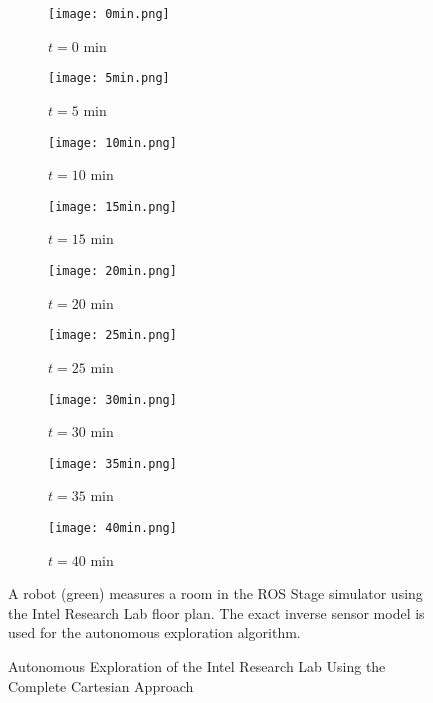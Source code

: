 \begin{figure}[!ht]
    \centering
    \begin{subfigure}[t]{0.3\columnwidth}
        \centering
        \texttt{[image: 0min.png]}
        \caption{$t=0$ min}
        \label{fig:IRL0min}
    \end{subfigure}
    \begin{subfigure}[t]{0.3\columnwidth}
        \centering
        \texttt{[image: 5min.png]}
        \caption{$t=5$ min}
        \label{fig:IRL5min}
    \end{subfigure}
    \begin{subfigure}[t]{0.3\columnwidth}
           \centering
           \texttt{[image: 10min.png]}
        \caption{$t=10$ min}
        \label{fig:IRL10min}
    \end{subfigure}
    \begin{subfigure}[t]{0.3\columnwidth}
           \centering
           \texttt{[image: 15min.png]}
        \caption{$t=15$ min}
        \label{fig:IRL15min}
    \end{subfigure}
    \begin{subfigure}[t]{0.3\columnwidth}
         \centering
         \texttt{[image: 20min.png]}
        \caption{$t=20$ min}
        \label{fig:IRL20min}
    \end{subfigure}
    \begin{subfigure}[t]{0.3\columnwidth}
           \centering
           \texttt{[image: 25min.png]}
        \caption{$t=25$ min}
        \label{fig:IRL25min}
    \end{subfigure}
    \begin{subfigure}[t]{0.3\columnwidth}
           \centering
           \texttt{[image: 30min.png]}
        \caption{$t=30$ min}
        \label{fig:IRL30min}
    \end{subfigure}
    \begin{subfigure}[t]{0.3\columnwidth}
           \centering
           \texttt{[image: 35min.png]}
        \caption{$t=35$ min}
        \label{fig:IRL35min}
    \end{subfigure}
    \begin{subfigure}[t]{0.3\columnwidth}
           \centering
           \texttt{[image: 40min.png]}
        \caption{$t=40$ min}
        \label{fig:IRL40min}
    \end{subfigure}
	\caption{Autonomous Exploration of the Intel Research Lab Using the Complete Cartesian Approach}
	\medskip
	\small
	A robot (green) measures a room in the ROS Stage simulator using the Intel Research Lab floor plan. The exact inverse sensor model is used for the autonomous exploration algorithm.
    \label{fig:IRL}
\end{figure}



